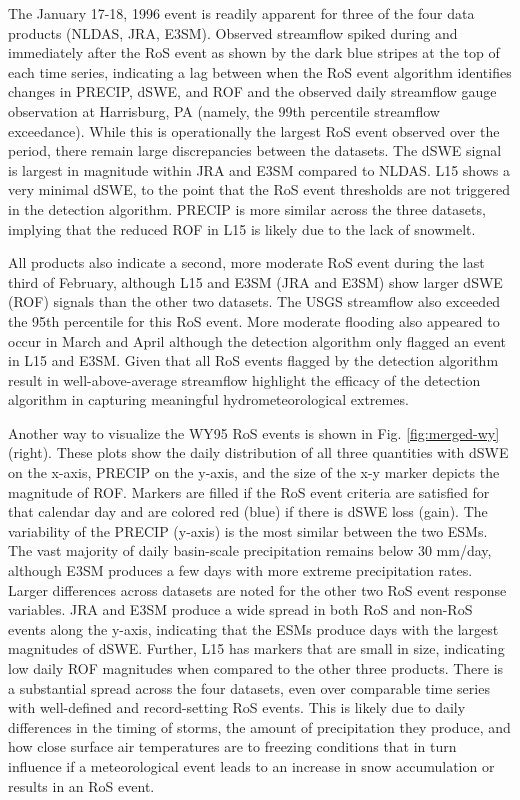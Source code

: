 \documentclass[draft]{agujournal2019}
\begin{document}
The January 17-18, 1996 event is readily apparent for three of the four data products (NLDAS, JRA, E3SM). 
Observed streamflow spiked during and immediately after the RoS event as shown by the dark blue stripes at the top of each time series, indicating a lag between when the RoS event algorithm identifies changes in PRECIP, dSWE, and ROF and the observed daily streamflow gauge observation at Harrisburg, PA (namely, the 99th percentile streamflow exceedance).
While this is operationally the largest RoS event observed over the period, there remain large discrepancies between the datasets. 
The dSWE signal is largest in magnitude within JRA and E3SM compared to NLDAS. 
L15 shows a very minimal dSWE, to the point that the RoS event thresholds are not triggered in the detection algorithm. 
PRECIP is more similar across the three datasets, implying that the reduced ROF in L15 is likely due to the lack of snowmelt.

All products also indicate a second, more moderate RoS event during the last third of February, although L15 and E3SM (JRA and E3SM) show larger dSWE (ROF) signals than the other two datasets. 
The USGS streamflow also exceeded the 95th percentile for this RoS event. 
More moderate flooding also appeared to occur in March and April although the detection algorithm only flagged an event in L15 and E3SM. 
Given that all RoS events flagged by the detection algorithm result in well-above-average streamflow highlight the efficacy of the detection algorithm in capturing meaningful hydrometeorological extremes.

Another way to visualize the WY95 RoS events is shown in Fig. \ref{fig:merged-wy} (right).  These plots show the daily distribution of all three quantities with dSWE on the x-axis, PRECIP on the y-axis, and the size of the x-y marker depicts the magnitude of ROF.
Markers are filled if the RoS event criteria are satisfied for that calendar day and are colored red (blue) if there is dSWE loss (gain). 
The variability of the PRECIP (y-axis) is the most similar between the two ESMs.
The vast majority of daily basin-scale precipitation remains below 30 mm/day, although E3SM produces a few days with more extreme precipitation rates. 
Larger differences across datasets are noted for the other two RoS event response variables. 
JRA and E3SM produce a wide spread in both RoS and non-RoS events along the y-axis, indicating that the ESMs produce days with the largest magnitudes of dSWE. 
Further, L15 has markers that are small in size, indicating low daily ROF magnitudes when compared to the other three products.
There is a substantial spread across the four datasets, even over comparable time series with well-defined and record-setting RoS events.
This is likely due to daily differences in the timing of storms, the amount of precipitation they produce, and how close surface air temperatures are to freezing conditions that in turn influence if a meteorological event leads to an increase in snow accumulation or results in an RoS event.
\end{document}
